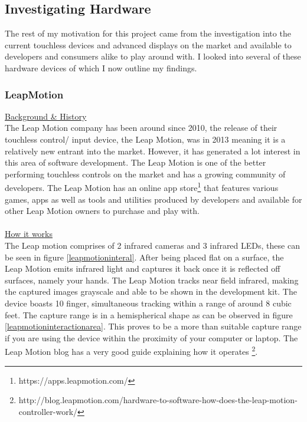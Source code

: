 \documentclass[11pt]{report}
\begin{document}
\subsection*{Investigating Hardware}
The rest of my motivation for this project came from the investigation into 
the current touchless devices and advanced displays on the market and 
available to developers and consumers alike to play around with. I looked 
into several of these hardware devices of which I now outline my findings.
 
\subsubsection*{LeapMotion}
\underline{Background \& History} \\ 
The Leap Motion company has been around since 2010, the release of their 
touchless control/ input device, the Leap Motion, was in 2013 meaning it
is a relatively new entrant into the market. However, it has generated a 
lot interest in this area of software development. The Leap Motion is one 
of the better performing touchless controls on the market and has a 
growing community of developers. The Leap Motion has an online app 
store\footnote{https://apps.leapmotion.com/} that features various games, 
apps as well as tools and utilities produced by developers and available 
for other Leap Motion owners to purchase and play with.
\\ \\
\underline{How it works} \\ 
The Leap motion comprises of 2 infrared cameras and 3 infrared LEDs,
these can be seen in figure \ref{leapmotioninteral}. After being 
placed flat on a surface, the Leap Motion emits infrared light and 
captures it back once it is reflected off surfaces, namely your hands.
The Leap Motion tracks near field infrared, making the captured images 
grayscale and able to be shown in the development kit.
The device boasts 10 finger, simultaneous tracking within a range
of around 8 cubic feet. The capture range is in a hemispherical shape
as can be observed in figure \ref{leapmotioninteractionarea}. This 
proves to be a more than suitable capture range if you are using the
device within the proximity of your computer or laptop. The Leap Motion
blog has a very good guide explaining how it operates 
\footnote{http://blog.leapmotion.com/hardware-to-software-how-does-the-leap-motion-controller-work/}.
\end{document}
